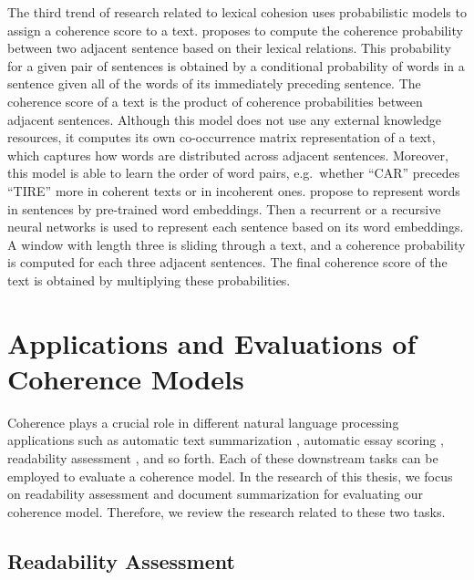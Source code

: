 The third trend of research related to lexical cohesion uses probabilistic models to assign a coherence score to a text. 
 proposes to compute the coherence probability between two adjacent sentence based on their lexical relations. 
This probability for a given pair of sentences is obtained by a conditional probability of words in a sentence given all of the words of its immediately preceding sentence. 
The coherence score of a text is the product of coherence probabilities between adjacent sentences. 
Although this model does not use any external knowledge resources, it computes its own co-occurrence matrix representation of a  text, which captures how words are distributed across adjacent sentences. 
Moreover, this model is able to learn the order of word pairs, e.g.\ whether ``CAR'' precedes ``TIRE'' more in coherent texts or in incoherent ones.  
 propose to represent words in sentences by pre-trained word embeddings. 
Then a recurrent or a recursive neural networks is used to represent each sentence based on its word embeddings. 
A window with length three is sliding through a text, and a coherence probability is computed for each three adjacent sentences.  
The final coherence score of the text is obtained by multiplying these probabilities. 

\section{Applications and Evaluations of Coherence Models}
\label{sec:rel-coh-applications}

Coherence plays a crucial role in different natural language processing applications such as automatic text summarization \cite{celikyilmaz11,linzhiheng12,fengvanessawei12a}, automatic essay scoring \cite{miltsakaki04a,higgins04,burstein10}, readability assessment \cite{pitler08,wangxinhao13}, and so forth.  
Each of these downstream tasks can be employed to evaluate a coherence model. 
In the research of this thesis, we focus on readability assessment and document summarization for evaluating our coherence model. 
Therefore, we review the research related to these two tasks. 

\subsection{Readability Assessment}

